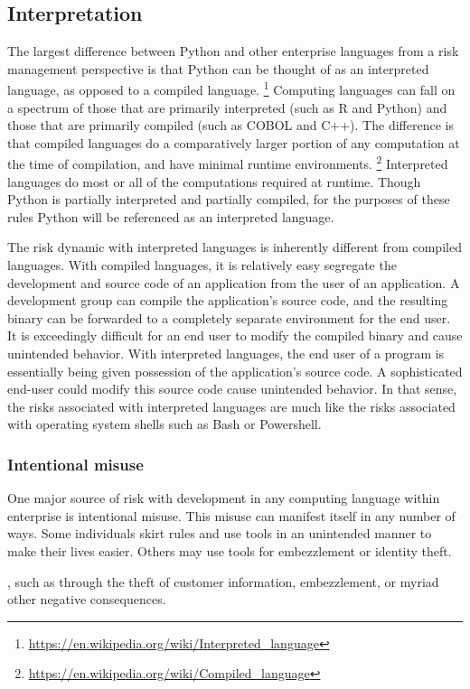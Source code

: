 	\subsection{Interpretation}
		The largest difference between Python and other enterprise languages from a risk management perspective is that Python can be thought of as an interpreted language, as opposed to a compiled language. 
		\footnote{\url{https://en.wikipedia.org/wiki/Interpreted_language}} 
		Computing languages can fall on a spectrum of those that are primarily interpreted (such as R and Python) and those that are primarily compiled (such as COBOL and C++). The difference is that compiled languages do a comparatively larger portion of any computation at the time of compilation, and have minimal runtime environments. 
		\footnote{\url{https://en.wikipedia.org/wiki/Compiled_language}} 
		Interpreted languages do most or all of the computations required at runtime. Though Python is partially interpreted and partially compiled, for the purposes of these rules Python will be referenced as an interpreted language.

		The risk dynamic with interpreted languages is inherently different from compiled languages. With compiled languages, it is relatively easy segregate the development and source code of an application from the user of an application. A development group can compile the application's source code, and the resulting binary can be forwarded to a completely separate environment for the end user. It is exceedingly difficult for an end user to modify the compiled binary and cause unintended behavior. With interpreted languages, the end user of a program is essentially being given possession of the application's source code. A sophisticated end-user could modify this source code cause unintended behavior. In that sense, the risks associated with interpreted languages are much like the risks associated with operating system shells such as Bash or Powershell.

		\subsubsection{Intentional misuse}
			One major source of risk with development in any computing language within enterprise is intentional misuse. This misuse can manifest itself in any number of ways. Some individuals skirt rules and use tools in an unintended manner to make their lives easier. Others may use tools for embezzlement or identity theft.

			
			, such as through the theft of customer information, embezzlement, or myriad other negative consequences.


